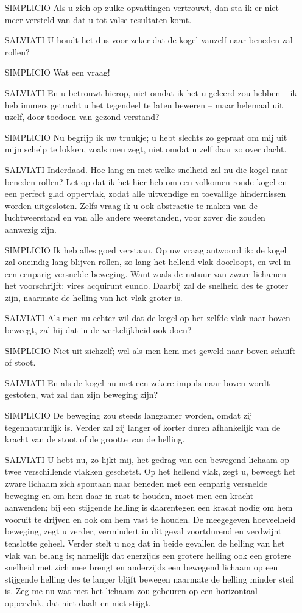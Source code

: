 \documentclass{ximera}
\begin{document}
{\begin{enumerate}
	\item[SIMPLICIO]Als u zich op zulke opvattingen vertrouwt, dan sta ik er niet meer versteld van dat u tot valse resultaten komt.
	\item[SALVIATI]U houdt het dus voor zeker dat de kogel vanzelf naar beneden zal rollen?
	\item[SIMPLICIO]Wat een vraag!
	\item[SALVIATI]En u betrouwt hierop, niet omdat ik het u geleerd zou hebben -- ik heb immers getracht u het tegendeel te laten beweren -- maar helemaal uit uzelf, door toedoen van gezond verstand?
	\item[SIMPLICIO]Nu begrijp ik uw truukje; u hebt slechts zo gepraat om mij uit mijn schelp te lokken, zoals men zegt, niet omdat u zelf daar zo over dacht.
	\item[SALVIATI]Inderdaad. Hoe lang en met welke snelheid zal nu die kogel naar beneden rollen? Let op dat ik het hier heb om een volkomen ronde kogel en een perfect glad oppervlak, zodat alle uitwendige en toevallige hindernissen worden uitgesloten. Zelfs vraag ik u ook abstractie te maken van de luchtweerstand en van alle andere weerstanden, voor zover die zouden aanwezig zijn.
	\item[SIMPLICIO]Ik heb alles goed verstaan. Op uw vraag antwoord ik: de kogel zal oneindig lang blijven rollen, zo lang het hellend vlak doorloopt, en wel in een eenparig versnelde beweging. Want zoals de natuur van zware lichamen het voorschrijft: vires acquirunt eundo. Daarbij zal de snelheid des te groter zijn, naarmate de helling van het vlak groter is.
	\item[SALVIATI]Als men nu echter wil dat de kogel op het zelfde vlak naar boven beweegt, zal hij dat in de werkelijkheid ook doen?
	\item[SIMPLICIO]Niet uit zichzelf; wel als men hem met geweld naar boven schuift of stoot.
	\item[SALVIATI]En als de kogel nu met een zekere impuls naar boven wordt gestoten, wat zal dan zijn beweging zijn?
	\item[SIMPLICIO]De beweging zou steeds langzamer worden, omdat zij tegennatuurlijk is. Verder zal zij langer of korter duren afhankelijk van de kracht van de stoot of de grootte van de helling.
	\item[SALVIATI]U hebt nu, zo lijkt mij, het gedrag van een bewegend lichaam op twee verschillende vlakken geschetst. Op het hellend vlak, zegt u, beweegt het zware lichaam zich spontaan naar beneden met een eenparig versnelde beweging en om hem daar in rust te houden, moet men een kracht aanwenden; bij een stijgende helling is daarentegen een kracht nodig om hem vooruit te drijven en ook om hem vast te houden. De meegegeven hoeveelheid beweging, zegt u verder, vermindert in dit geval voortdurend en verdwijnt tenslotte geheel. Verder stelt u nog dat in beide gevallen de helling van het vlak van belang is; namelijk dat enerzijds een grotere helling ook een grotere snelheid met zich mee brengt en anderzijds een bewegend lichaam op een stijgende helling des te langer blijft bewegen naarmate de helling minder steil is. Zeg me nu wat met het lichaam zou gebeuren op een horizontaal oppervlak, dat niet daalt en niet stijgt.

\end{enumerate}}
\end{document}
